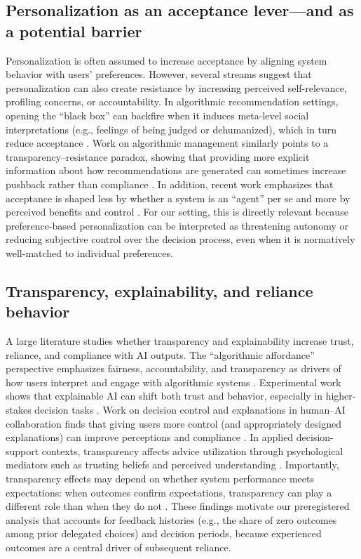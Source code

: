 \documentclass[a4paper, 12pt, fleqn]{article}
\theoremstyle{definition}
\begin{document}
\subsection{Personalization as an acceptance lever---and as a potential barrier}
Personalization is often assumed to increase acceptance by aligning system behavior with users' preferences. However, several streams suggest that personalization can also create resistance by increasing perceived self-relevance, profiling concerns, or accountability. In algorithmic recommendation settings, opening the ``black box'' can backfire when it induces meta-level social interpretations (e.g., feelings of being judged or dehumanized), which in turn reduce acceptance \citep{Chen2024}. Work on algorithmic management similarly points to a transparency--resistance paradox, showing that providing more explicit information about how recommendations are generated can sometimes increase pushback rather than compliance \citep{Hu2024}. In addition, recent work emphasizes that acceptance is shaped less by whether a system is an ``agent'' per se and more by perceived benefits and control \citep{Schaap2024}. For our setting, this is directly relevant because preference-based personalization can be interpreted as threatening autonomy or reducing subjective control over the decision process, even when it is normatively well-matched to individual preferences.

\subsection{Transparency, explainability, and reliance behavior}
A large literature studies whether transparency and explainability increase trust, reliance, and compliance with AI outputs. The ``algorithmic affordance'' perspective emphasizes fairness, accountability, and transparency as drivers of how users interpret and engage with algorithmic systems \citep{Shin2019}. Experimental work shows that explainable AI can shift both trust and behavior, especially in higher-stakes decision tasks \citep{Leichtmann2023}. Work on decision control and explanations in human--AI collaboration finds that giving users more control (and appropriately designed explanations) can improve perceptions and compliance \citep{Westphal2023}. In applied decision-support contexts, transparency affects advice utilization through psychological mediators such as trusting beliefs and perceived understanding \citep{Ning2024}. Importantly, transparency effects may depend on whether system performance meets expectations: when outcomes confirm expectations, transparency can play a different role than when they do not \citep{Sun2026}. These findings motivate our preregistered analysis that accounts for feedback histories (e.g., the share of zero outcomes among prior delegated choices) and decision periods, because experienced outcomes are a central driver of subsequent reliance.
\end{document}
